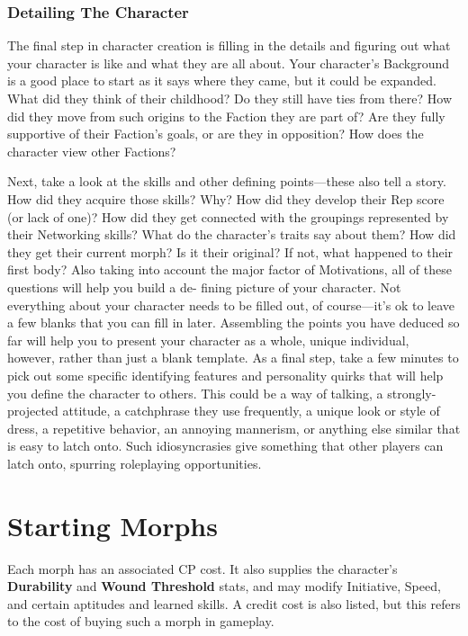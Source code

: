 \subsubsection{Detailing The Character} \label{sec:detailing-the-character} 

The final step in character creation is filling in the details and figuring out what your character is like and what they are all about. Your character’s Background is a good place to start as it says where they came, but it could be expanded. What did they think of their childhood? Do they still have ties from there? How did they move from such origins to the Faction they are part of? Are they fully supportive of their Faction’s goals, or are they in opposition? How does the character view other Factions? 

Next, take a look at the skills and other defining points—these also tell a story. How did they acquire those skills? Why? How did they develop their Rep score (or lack of one)? How did they get connected with the groupings represented by their Networking skills? What do the character’s traits say about them? How did they get their current morph? Is it their original? If not, what happened to their first body? Also taking into account the major factor of Motivations, all of these questions will help you build a de- fining picture of your character. Not everything about your character needs to be filled out, of course—it’s ok to leave a few blanks that you can fill in later. Assembling the points you have deduced so far will help you to present your character as a whole, unique individual, however, rather than just a blank template. As a final step, take a few minutes to pick out some specific identifying features and personality quirks that will help you define the character to others. This could be a way of talking, a strongly-projected attitude, a catchphrase they use frequently, a unique look or style of dress, a repetitive behavior, an annoying mannerism, or anything else similar that is easy to latch onto. Such idiosyncrasies give something that other players can latch onto, spurring roleplaying opportunities. 

\section{Starting Morphs} 

Each morph has an associated CP cost. It also supplies the character’s \textbf{Durability} and \textbf{Wound Threshold} stats, and may modify Initiative, Speed, and certain aptitudes and learned skills. A credit cost is also listed, but this refers to the cost of buying such a morph in gameplay. 

